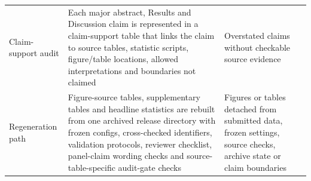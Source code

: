 \documentclass[11pt, letterpaper]{article}
\begin{document}
\begin{table}[p]
\begin{tabular}{L{0.24\textwidth}L{0.44\textwidth}L{0.22\textwidth}}
Claim-support audit & Each major abstract, Results and Discussion claim is represented in a claim-support table that links the claim to source tables, statistic scripts, figure/table locations, allowed interpretations and boundaries not claimed & Overstated claims without checkable source evidence \\
Regeneration path & Figure-source tables, supplementary tables and headline statistics are rebuilt from one archived release directory with frozen configs, cross-checked identifiers, validation protocols, reviewer checklist, panel-claim wording checks and source-table-specific audit-gate checks & Figures or tables detached from submitted data, frozen settings, source checks, archive state or claim boundaries \\
\bottomrule
\end{tabular}
\endgroup
\label{supp-tab:reproducibility_gates}
\end{table}
\end{document}
